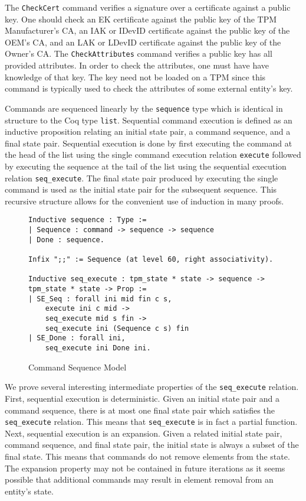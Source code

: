 \documentclass[runningheads]{llncs}
\begin{document}
The \verb|CheckCert| command verifies a signature over a certificate
against a public key. One should check an EK certificate against the
public key of the TPM Manufacturer's CA, an IAK or IDevID certificate
against the public key of the OEM's CA, and an LAK or LDevID
certificate against the public key of the Owner's CA.  The
\verb|CheckAttributes| command verifies a public key has all provided
attributes.  In order to check the attributes, one must have have
knowledge of that key. The key need not be loaded on a TPM since this
command is typically used to check the attributes of some external
entity's key.

Commands are sequenced linearly by the \verb|sequence| type which is
identical in structure to the Coq type \verb|list|. Sequential command
execution is defined as an inductive proposition relating an initial
state pair, a command sequence, and a final state pair. Sequential
execution is done by first executing the command at the head of the
list using the single command execution relation \verb|execute|
followed by executing the sequence at the tail of the list using the
sequential execution relation \verb|seq_execute|. The final state pair
produced by executing the single command is used as the initial state
pair for the subsequent sequence. This recursive structure allows for
the convenient use of induction in many proofs.

\begin{figure}[hbtp]
\begin{lstlisting}[language=Coq]
Inductive sequence : Type :=
| Sequence : command -> sequence -> sequence
| Done : sequence.

Infix ";;" := Sequence (at level 60, right associativity).

Inductive seq_execute : tpm_state * state -> sequence -> tpm_state * state -> Prop :=
| SE_Seq : forall ini mid fin c s,
    execute ini c mid ->
    seq_execute mid s fin ->
    seq_execute ini (Sequence c s) fin
| SE_Done : forall ini,
    seq_execute ini Done ini.
\end{lstlisting}
\caption{Command Sequence Model}
\label{fig:command-sequence-model}
\end{figure}

We prove several interesting intermediate properties of the
\verb|seq_execute| relation. First, sequential execution is
deterministic. Given an initial state pair and a command sequence,
there is at most one final state pair which satisfies the
\verb|seq_execute| relation. This means that \verb|seq_execute| is in
fact a partial function. Next, sequential execution is an
expansion. Given a related initial state pair, command sequence, and
final state pair, the initial state is always a subset of the final
state. This means that commands do not remove elements from the
state. The expansion property may not be contained in future
iterations as it seems possible that additional commands may result in
element removal from an entity's state.
\end{document}
